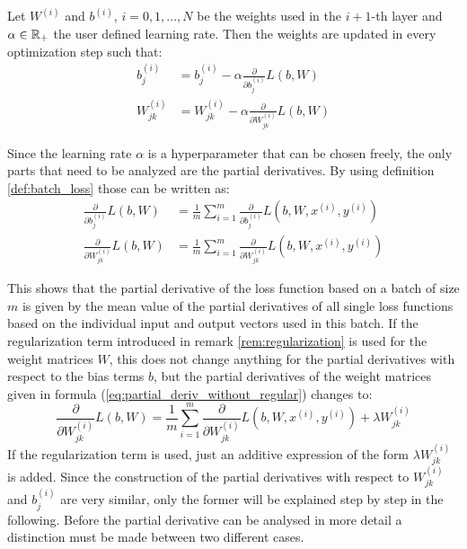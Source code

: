 \begin{remark}\label{rem:update}
	Let $W^{(i)}$ and $b^{(i)}$, $i = 0, 1, ..., N$ be the weights used in the $i+1$-th layer and $\alpha \in  \mathbb{R}_+$ the user defined learning rate. Then the weights are updated in every optimization step such that:
	\begin{align}
	b_j^{(i)} 		&= b_j^{(i)} - \alpha \frac{\partial}{\partial b_j^{(i)}} L(b, W)\\
	W_{jk}^{(i)} 	&= W_{jk}^{(i)} - \alpha \frac{\partial}{\partial W_{jk}^{(i)}} L(b, W)
	\end{align}	
\end{remark}

Since the learning rate $\alpha$ is a hyperparameter that can be chosen freely, the only parts that need to be analyzed are the partial derivatives. By using definition \ref{def:batch_loss} those can be written as:
\begin{align}
	\frac{\partial}{\partial b_j^{(i)}} L(b, W) 	&= \frac{1}{m} \sum_{i = 1}^m \frac{\partial}{\partial b_j^{(i)}} L(b, W, x^{(i)}, y^{(i)}) \\
	\frac{\partial}{\partial W_{jk}^{(i)}} L(b, W)	&= \frac{1}{m} \sum_{i = 1}^m \frac{\partial}{\partial W_{jk}^{(i)}} L(b, W, x^{(i)}, y^{(i)}) \label{eq:partial_deriv_without_regular}
\end{align}

This shows that the partial derivative of the loss function based on a batch of size $m$ is given by the mean value of the partial derivatives of all single loss functions based on the individual input and output vectors used in this batch. If the regularization term introduced in remark \ref{rem:regularization} is used for the weight matrices $W$, this does not change anything for the partial derivatives with respect to the bias terms $b$, but the partial derivatives of the weight matrices given in formula (\ref{eq:partial_deriv_without_regular}) changes to:
\begin{equation}
		\frac{\partial}{\partial W_{jk}^{(i)}} L(b, W) = \frac{1}{m} \sum_{i = 1}^m \frac{\partial}{\partial W_{jk}^{(i)}} L(b, W, x^{(i)}, y^{(i)}) + \lambda  W_{jk}^{(i)}
\end{equation}
If the regularization term is used, just an additive expression of the form $\lambda W_{jk}^{(i)}$ is added. Since the construction of the partial derivatives with respect to $W_{jk}^{(i)}$ and $b_j^{(i)}$ are very similar, only the former will be explained step by step in the following. Before the partial derivative can be analysed in more detail a distinction must be made between two different cases.

